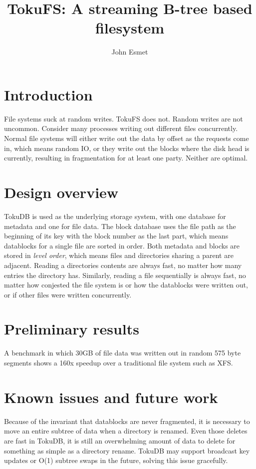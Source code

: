 \documentclass[12pt] {article}
\begin{document}
\title {TokuFS: A streaming B-tree based filesystem}
\author {John Esmet}

\maketitle


\section* {Introduction}
File systems suck at random writes. TokuFS does not. Random writes
are not uncommon. Consider many processes writing out different
files concurrently. Normal file systems will either write out
the data by offset as the requests come in, which means random IO,
or they write out the blocks where the disk head is currently,
resulting in fragmentation for at least one party. Neither
are optimal.

\section* {Design overview}

TokuDB is used as the underlying storage system, with one database for 
metadata and one for file data. The block database uses the file path as the
beginning of its key with the block number as the last part, which means
datablocks for a single file are sorted in order. Both metadata and blocks
are stored in \emph{level order}, which means files and directories sharing 
a parent are adjacent. Reading a directories contents are always fast, no
matter how many entries the directory has. Similarly, reading a file
sequentially is always fast, no matter how conjested the file system is
or how the datablocks were written out, or if other files were written
concurrently.

\section* {Preliminary results}

A benchmark in which 30GB of file data was written out in random 575 byte
segments shows a 160x speedup over a traditional file system such as XFS.

\section* {Known issues and future work}

Because of the invariant that datablocks are never fragmented, it is necessary
to move an entire subtree of data when a directory is renamed. Even those
deletes are fast in TokuDB, it is still an overwhelming amount of data to 
delete for something as simple as a directory rename. TokuDB may support
broadcast key updates or O(1) subtree swaps in the future, solving this
issue gracefully.
\end{document}
